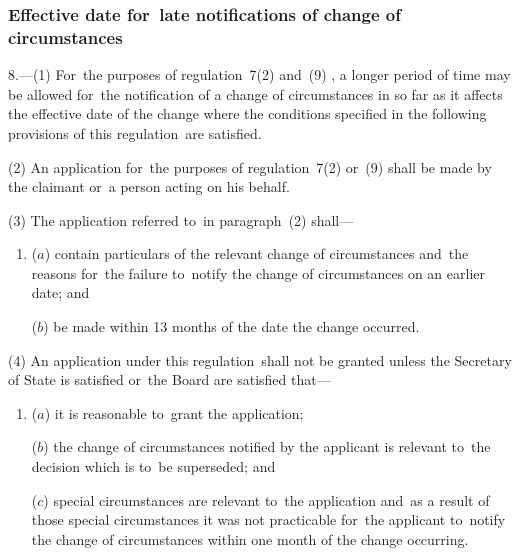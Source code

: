 \documentclass[12pt,a4paper]{article}
\begin{document}

\subsubsection[8. Effective date for~late notifications of change of circumstances]{Effective date for~late notifications of change of circumstances}

8.—(1) For~the purposes of regulation~7(2)
and~(9)%
, a longer period of time may be allowed for~the notification of a change of circumstances in so far as it affects the effective date of the change where the conditions specified in the following provisions of this regulation~are satisfied.

(2) An application for~the purposes of regulation~7(2) 
or~(9)  %
shall be made by the claimant or~a person acting on his behalf.

(3) The application referred to~in paragraph~(2) shall—
\begin{enumerate}\item[]
($a$) contain particulars of the relevant change of circumstances and~the reasons for~the failure to~notify the change of circumstances on an earlier date; and

($b$) be made within 13 months of the date the change occurred.
\end{enumerate}

(4) An application under this regulation~shall not be granted unless the Secretary of State is satisfied 
or~the Board are satisfied  %
that—
\begin{enumerate}\item[]
($a$) it is reasonable to~grant the application;

($b$) the change of circumstances notified by the applicant is relevant to~the decision which is to~be superseded; and

($c$) special circumstances are relevant to~the application and~as a result of those special circumstances it was not practicable for~the applicant to~notify the change of circumstances within one month of the change occurring.
\end{enumerate}
\end{document}
